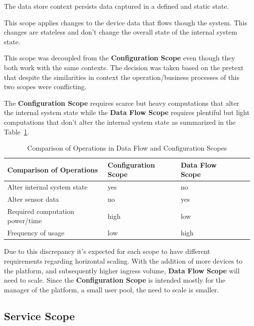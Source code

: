 The data store context persists data captured in a defined and static state.

This scope applies changes to the device data that flows though the system. This changes are stateless and don't change the overall state of the internal system state.

This scope was decoupled from the \textbf{Configuration Scope} even though they both work with the same contexts. The decision was taken based on the pretext that despite the similarities in context the operation/business processes of this two scopes were conflicting.

The \textbf{Configuration Scope} requires scarce but heavy computations that alter the internal system state while the \textbf{Data Flow Scope} requires plentiful but light computations that don't alter the internal system state as summarized in the Table~\ref{tab:design:system_scopes:data_flow_scope:comparison}.

\begin{table}[!ht]
   \centering
   \begin{tabular}{@{}lllll@{}}
   \toprule
   \textbf{Comparison of Operations} & \textbf{Configuration Scope} & \textbf{Data Flow Scope} \\ \midrule
       Alter internal system state & yes & no \\ \hline
       Alter sensor data & no & yes \\ \hline
       Required computation power/time & high & low \\ \hline
       Frequency of usage & low & high \\ \hline
   \end{tabular}
   \caption[Comparison of Operations in Data Flow and Configuration Scopes]{Comparison of Operations in Data Flow and Configuration Scopes}
   \label{tab:design:system_scopes:data_flow_scope:comparison}
\end{table}

Due to this discrepancy it's expected for each scope to have different requirements regarding horizontal scaling. With the addition of more devices to the platform, and subsequently higher ingress volume, \textbf{Data Flow Scope} will need to scale. Since the \textbf{Configuration Scope} is intended mostly for the manager of the platform, a small user pool, the need to scale is smaller.

\subsection{Service Scope}
\label{subsec:design:system_scopes:service_scope}

